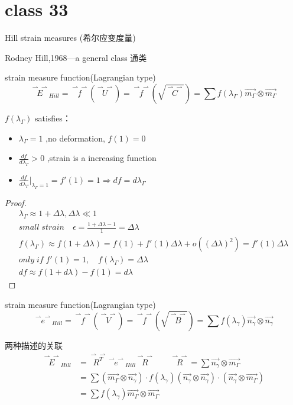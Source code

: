 \documentclass[12pt, a4paper, oneside, UTF8]{ctexbook}  %
\newcommand{\vvec}{\overset{\rightharpoonup\!\!\!\! \rightharpoonup}}
\begin{document}
\section{class 33}
\begin{defn}
	Hill strain measures (希尔应变度量)

	Rodney Hill,1968---a general class 通类

	strain measure function(Lagrangian type)
	\[
	\vvec{E}_{Hill}=\vvec{f}(\vvec{U})=\vvec{f}(\sqrt{\vvec{C}})=\sum f(\lambda_\Gamma)
	\vec{m_\Gamma}\otimes\vec{m_\Gamma}
	\]

	\(f(\lambda_\Gamma)\) satisfies：
	\begin{itemize}
		\item $\lambda_\Gamma=1$ ,no deformation, $f(1)=0$
		\item $\frac{df}{d\lambda_\Gamma}>0$ ,strain is a increasing function
		\item \(\frac{df}{d\lambda_\Gamma}|_{\lambda_\Gamma=1}=
		f'(1)=1\Rightarrow df=d\lambda_\Gamma\)
	\end{itemize}
\begin{proof}
		\begin{gather*}
			\lambda_\Gamma\approx1+\varDelta\lambda,\varDelta\lambda\ll1\\
			small\; strain\quad\epsilon=\frac{1+\varDelta\lambda-1}{1}=\varDelta\lambda\\
			f(\lambda_\Gamma)\approx f(1+\varDelta\lambda)=f(1)+f'(1)\varDelta\lambda
			+o((\varDelta\lambda)^2)=f'(1)\varDelta\lambda\\
			only\; if\; f'(1)=1,\quad f(\lambda_\Gamma)=\varDelta\lambda\\
			df\approx f(1+d\lambda)-f(1)=d\lambda
		\end{gather*}
\end{proof}

	strain measure function(Lagrangian type)
	\[
		\vvec{e}_{Hill}=\vvec{f}(\vvec{V})=\vvec{f}(\sqrt{\vvec{B}})=\sum f(\lambda_\gamma)
		\vec{n_\gamma}\otimes\vec{n_\gamma}
	\]

	两种描述的关联
	\begin{align*}
		\vvec{E}_{Hill}&=\vvec{R^T}\vvec{e}_{Hill}\vvec{R}\quad\quad
		\vvec{R}=\sum\vec{n_\gamma}\otimes\vec{m_\Gamma}\\
		&=\sum(\vec{m_\Gamma}\otimes\vec{n_\gamma})\cdot f(\lambda_\gamma)
		(\vec{n_\gamma}\otimes\vec{n_\gamma})\cdot(\vec{n_\gamma}\otimes\vec{m_\Gamma})\\
		&=\sum f(\lambda_\gamma)\vec{m_\Gamma}\otimes\vec{m_\Gamma}
	\end{align*}
\end{defn}
\end{document}
